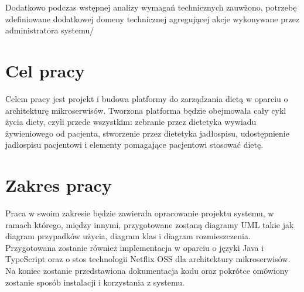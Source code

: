 Dodatkowo podczas wstępnej analizy wymagań technicznych zauwżono, potrzebę zdefiniowane dodatkowej domeny technicznej agregującej akcje wykonywane przez administratora systemu/

\section*{Cel pracy}\label{sec:thesis-goal}

Celem pracy jest projekt i budowa platformy do zarządzania dietą w oparciu o architekturę mikroserwisów.
Tworzona platforma będzie obejmowała cały cykl życia diety, czyli przede wszystkim:
zebranie przez dietetyka wywiadu żywieniowego od pacjenta,
stworzenie przez dietetyka jadłospisu,
udostępnienie jadłospisu pacjentowi
i elementy pomagające pacjentowi stosować dietę.

\section*{Zakres pracy}\label{sec:scope-of-work}

Praca w swoim zakresie będzie zawierała
opracowanie projektu systemu, w ramach którego, między innymi, przygotowane zostaną diagramy UML takie jak diagram przypadków użycia, diagram klas i diagram rozmieszczenia.
Przygotowana zostanie również implementacja w oparciu o języki Java\cite{tech:java} i TypeScript\cite{tech:typescript} oraz o stos technologii Netflix OSS\cite{tech:netflix-oss} dla architektury mikroserwisów.
Na koniec zostanie przedstawiona dokumentacja kodu oraz pokrótce omówiony zostanie sposób instalacji i korzystania z systemu.

\thispagestyle{normal}
